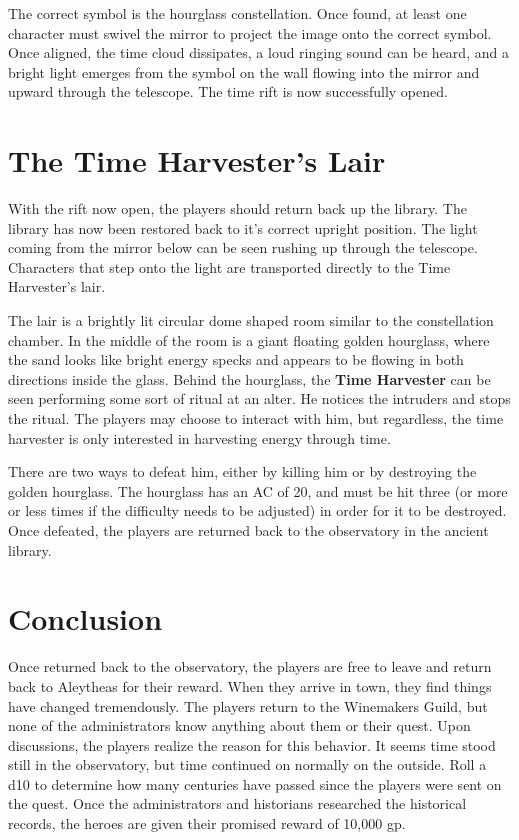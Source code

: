 \documentclass{article}
\begin{document}
\begin{multicols*}{2}
	The correct symbol is the hourglass constellation. Once found, at least one character must swivel the mirror to project the image onto the correct symbol. Once aligned, the time cloud dissipates, a loud ringing sound can be heard, and a bright light emerges from the symbol on the wall flowing into the mirror and upward through the telescope. The time rift is now successfully opened.
	
	\section{The Time Harvester's Lair}
	With the rift now open, the players should return back up the library. The library has now been restored back to it's correct upright position. The light coming from the mirror below can be seen rushing up through the telescope. Characters that step onto the light are transported directly to the Time Harvester's lair.
	
	The lair is a brightly lit circular dome shaped room similar to the constellation chamber. In the middle of the room is a giant floating golden hourglass, where the sand looks like bright energy specks and appears to be flowing in both directions inside the glass. Behind the hourglass, the \textbf{Time Harvester} can be seen performing some sort of ritual at an alter. He notices the intruders and stops the ritual. The players may choose to interact with him, but regardless, the time harvester is only interested in harvesting energy through time.
	
	There are two ways to defeat him, either by killing him or by destroying the golden hourglass. The hourglass has an AC of 20, and must be hit three (or more or less times if the difficulty needs to be adjusted) in order for it to be destroyed. Once defeated, the players are returned back to the observatory in the ancient library. 
	
	\section{Conclusion}
	Once returned back to the observatory, the players are free to leave and return back to Aleytheas for their reward. When they arrive in town, they find things have changed tremendously. The players return to the Winemakers Guild, but none of the administrators know anything about them or their quest. Upon discussions, the players realize the reason for this behavior. It seems time stood still in the observatory, but time continued on normally on the outside. Roll a d10 to determine how many centuries have passed since the players were sent on the quest. Once the administrators and historians researched the historical records, the heroes are given their promised reward of 10,000 gp.
	\vfill

	\pagebreak
	
	
\end{multicols*}
	
\end{document}

